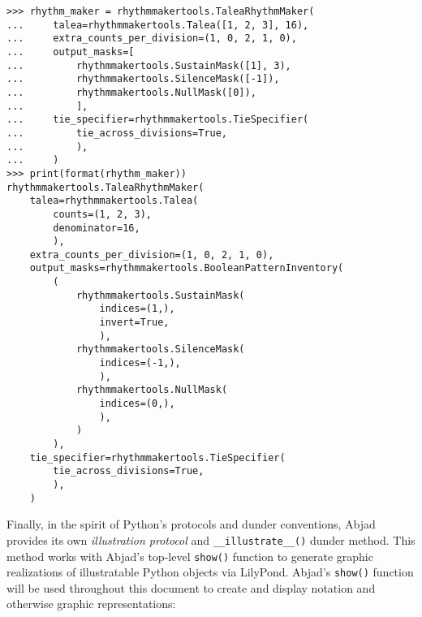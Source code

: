 \begin{comment}
<abjad>
rhythm_maker = rhythmmakertools.TaleaRhythmMaker(
    talea=rhythmmakertools.Talea([1, 2, 3], 16),
    extra_counts_per_division=(1, 0, 2, 1, 0),
    output_masks=[
        rhythmmakertools.SustainMask([1], 3),
        rhythmmakertools.SilenceMask([-1]),
        rhythmmakertools.NullMask([0]),
        ],
    tie_specifier=rhythmmakertools.TieSpecifier(
        tie_across_divisions=True,
        ),
    )
print(format(rhythm_maker))
</abjad>
\end{comment}

\begin{abjadbookoutput}
\begin{singlespacing}
\vspace{-0.5\baselineskip}
\begin{lstlisting}
>>> rhythm_maker = rhythmmakertools.TaleaRhythmMaker(
...     talea=rhythmmakertools.Talea([1, 2, 3], 16),
...     extra_counts_per_division=(1, 0, 2, 1, 0),
...     output_masks=[
...         rhythmmakertools.SustainMask([1], 3),
...         rhythmmakertools.SilenceMask([-1]),
...         rhythmmakertools.NullMask([0]),
...         ],
...     tie_specifier=rhythmmakertools.TieSpecifier(
...         tie_across_divisions=True,
...         ),
...     )
>>> print(format(rhythm_maker))
rhythmmakertools.TaleaRhythmMaker(
    talea=rhythmmakertools.Talea(
        counts=(1, 2, 3),
        denominator=16,
        ),
    extra_counts_per_division=(1, 0, 2, 1, 0),
    output_masks=rhythmmakertools.BooleanPatternInventory(
        (
            rhythmmakertools.SustainMask(
                indices=(1,),
                invert=True,
                ),
            rhythmmakertools.SilenceMask(
                indices=(-1,),
                ),
            rhythmmakertools.NullMask(
                indices=(0,),
                ),
            )
        ),
    tie_specifier=rhythmmakertools.TieSpecifier(
        tie_across_divisions=True,
        ),
    )
\end{lstlisting}
\end{singlespacing}
\end{abjadbookoutput}

\noindent Finally, in the spirit of Python's protocols and dunder conventions,
Abjad provides its own \emph{illustration protocol} and
\texttt{\_\_illustrate\_\_()} dunder method. This method works with Abjad's
top-level \texttt{show()} function to generate graphic realizations of
illustratable Python objects via LilyPond. Abjad's \texttt{show()} function
will be used throughout this document to create and display notation and
otherwise graphic representations:

